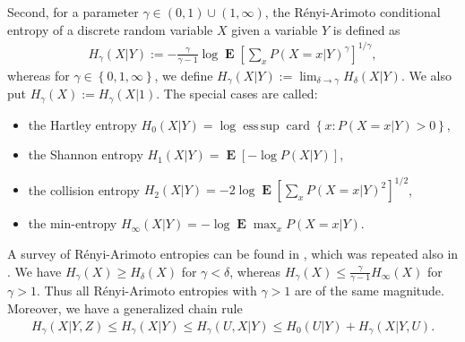 \documentclass[a4paper,12pt]{article}
\newcommand{\kwad}[1]{\left[ #1 \right]}
\newcommand{\klam}[1]{\left\{ #1 \right\}}
\DeclareMathOperator{\esssup}{ess\, sup}
\DeclareMathOperator{\card}{card}
\DeclareMathOperator{\mean}{\mathbf{E}}
\begin{document}
Second, for a parameter $\gamma\in(0,1)\cup(1,\infty)$, the
R\'enyi-Arimoto conditional entropy of a discrete random variable $X$
given a variable $Y$ is defined as
\begin{align}
  \label{RenyiArimoto}
  H_\gamma(X|Y):=
  -\frac{\gamma}{\gamma-1}\log
  \mean\kwad{\sum_x P(X=x|Y)^{\gamma}}^{1/\gamma}
  ,
\end{align}
whereas for $\gamma\in\klam{0,1,\infty}$, we define
$H_\gamma(X|Y):=\lim_{\delta\rightarrow\gamma} H_\delta(X|Y)$.  We
also put $H_\gamma(X):=H_\gamma(X|1)$. The special cases are called:
\begin{itemize}
\item the Hartley entropy
$H_0(X|Y)= \log \esssup\card\klam{x: P(X=x|Y)>0}$,
\item  the Shannon
entropy $H_1(X|Y)=\mean\kwad{-\log P(X|Y)}$, 
\item the collision entropy
$H_2(X|Y)=-2\log \mean\kwad{\sum_x P(X=x|Y)^2}^{1/2}$,
\item the min-entropy $H_\infty(X|Y)=-\log \mean\max_{x} P(X=x|Y)$.
\end{itemize}
A survey of R\'enyi-Arimoto entropies can be found in
\cite{FehrBerens14}, which was repeated also in \cite[Section
9.1]{Debowski21}. We have $H_\gamma(X)\ge H_\delta(X)$ for
$\gamma<\delta$, whereas
$H_\gamma(X)\le \frac{\gamma}{\gamma-1}H_\infty(X)$ for $\gamma>1$.
Thus all R\'enyi-Arimoto entropies with $\gamma>1$ are of the same
magnitude.  Moreover, we have a generalized chain rule
\begin{align}
  \label{Chain}
  H_\gamma(X|Y,Z)\le H_\gamma(X|Y)\le H_\gamma(U,X|Y)\le
  H_0(U|Y)+H_\gamma(X|Y,U).
\end{align}
\end{document}
